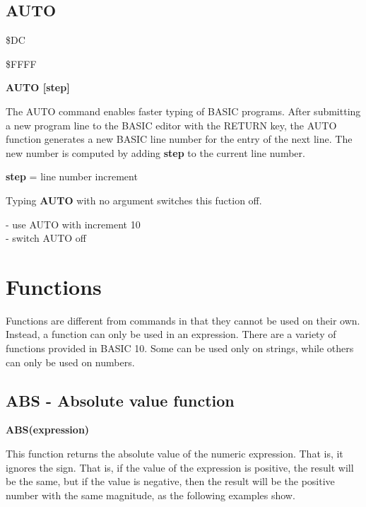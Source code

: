 \newpage
\subsection{AUTO}

\begin{description}[leftmargin=3cm,style=nextline]
\item [Token:] \$DC
\item [Address:] \$FFFF
\item [Format:]
  {\bf AUTO [step]}
\item [Usage:] The AUTO command enables faster typing of BASIC programs.
  After submitting a new program line to the BASIC editor with
  the RETURN key, the AUTO function generates a new BASIC line
  number for the entry of the next line. The new number is
  computed by adding {\bf step} to the current line number.

  {\bf step} = line number increment

  Typing {\bf AUTO} with no argument switches this fuction off.

\item [Example:]  - use AUTO with increment 10 \\
                   - switch AUTO off
\end{description}

\newpage

\section{Functions}

Functions are different from commands in that they cannot be used on their own.
Instead, a function can only be used in an expression.
There are a variety of functions provided in BASIC 10.
Some can be used only on strings, while others can only be used on numbers.

\subsection{ABS - Absolute value function}

{\bf ABS(expression)}

This function returns the absolute value of the numeric expression.
That is, it ignores the sign.  That is, if the value of the expression is positive,
the result will be the same, but if the value is negative, then the result
will be the positive number with the same magnitude, as the following examples show.

